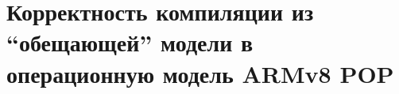 \chapter{Корректность компиляции из ``обещающей'' модели в операционную модель ARMv8 POP} \label{sec:armpop}


